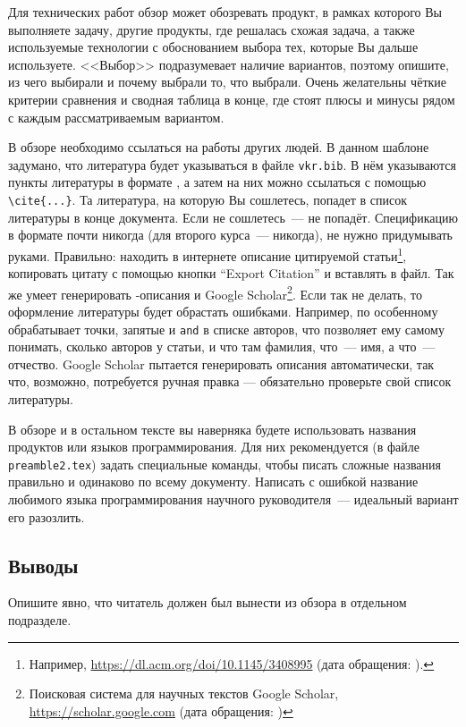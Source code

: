 Для технических работ обзор может обозревать продукт, в рамках которого Вы выполняете задачу, другие продукты, где решалась схожая задача, а также используемые технологии с обоснованием выбора тех, которые Вы дальше используете. <<Выбор>> подразумевает наличие вариантов, поэтому опишите, из чего выбирали и почему выбрали то, что выбрали. Очень желательны чёткие критерии сравнения и сводная таблица в конце, где стоят плюсы и минусы рядом с каждым рассматриваемым вариантом.

В обзоре необходимо ссылаться на работы других людей. В данном шаблоне задумано, что литература будет указываться в файле \verb=vkr.bib=. В нём указываются пункты литературы в формате \BibTeX{}, а затем на них можно ссылаться с помощью \verb=\cite{...}=. Та литература, на которую Вы сошлетесь, попадет в список литературы в конце документа. Если не сошлетесь~---  не попадёт. Спецификацию в формате \BibTeX{} почти никогда (для второго курса~--- никогда), не нужно придумывать руками. Правильно: находить в интернете описание цитируемой статьи\footnote{Например, \url{https://dl.acm.org/doi/10.1145/3408995} (дата обращения: ).},
копировать цитату с помощью кнопки \foreignquote{english}{Export Citation} и вставлять в \BibTeX{} файл. Так же умеет генерировать \BibTeX{}-описания и Google Scholar\footnote{Поисковая система для научных текстов Google Scholar, \url{https://scholar.google.com} (дата обращения: )}.
Если так не делать, то оформление литературы будет обрастать ошибками.
Например, \BibTeX{} по особенному обрабатывает точ\-ки, запятые и \verb=and= в списке авторов, что позволяет ему самому понимать, сколько авторов у статьи, и что там фамилия, что~--- имя, а что~--- отчество. Google Scholar пытается генерировать описания автоматически, так что, возможно, потребуется ручная правка --- обязательно проверьте свой список литературы.

В обзоре и в остальном тексте вы наверняка будете использовать названия продуктов или языков программирования.
Для них рекоменду\-ется (в файле \verb=preamble2.tex=) за\-дать специальные команды, чтобы писать сложные названия правильно и одинаково по всему доку\-менту.
Написать с ошибкой  название любимого языка программирова\-ния науч\-ного руко\-водителя~--- идеальный вариант его разозлить.

\subsection{Выводы}

Опишите явно, что читатель должен был вынести из обзора в отдельном подразделе.
